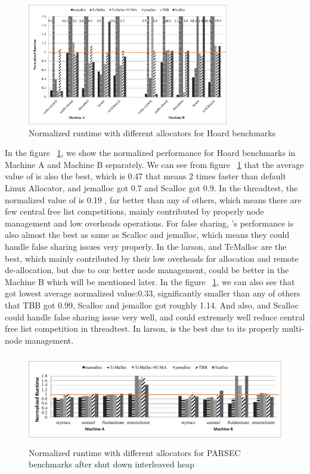 \begin{figure}[H]
    \centering
    \includegraphics[width=\textwidth,height=200]{paper/figure/hoard-perf.pdf}
    \caption{Normalized runtime with different allocators for Hoard benchmarks}
    \label{hoard-perf}
\end{figure}

In the figure ~\ref{hoard-perf}, we show the normalized performance for Hoard benchmarks in Machine A and Machine B separately. We can see from figure ~\ref{hoard-perf} that the average value of \NM{} is also the best, which is 0.47 that means 2 times faster than default Linux Allocator, and jemalloc got 0.7 and Scalloc got 0.9. In the threadtest, the normalized value of \NM{} is 0.19 , far better than any of others, which means there are few central free list competitions, mainly contributed by properly node management and low overheads operations. For false sharing, \NM{}'s performance is also almost the best as same as Scalloc and jemalloc, which means they could handle false sharing issues very properly. In the larson, \NM{} and TcMalloc are the best, which mainly contributed by their low overheads for allocation and remote de-allocation, but due to our better node management, \NM{} could be better in the Machine B which will be mentioned later. In the figure ~\ref{hoard-perf}, we can also see that \NM{} got lowest average normalized value:0.33, significantly smaller than any of others that TBB got 0.99, Scalloc and jemalloc got roughly 1.14. And also, \NM{} and Scalloc could handle false sharing issue very well, and \NM{} could extremely well reduce central free list competition in threadtest. In larson, \NM{} is the best due to its properly multi-node management. 
\begin{figure}[H]
    \centering
    \includegraphics[width=\textwidth,height=150]{paper/figure/no-interleaved.pdf}
    \caption{Normalized runtime with different allocators for PARSEC benchmarks after shut down interleaved heap}
    \label{parsec-no-interleaved-perf}
\end{figure}

